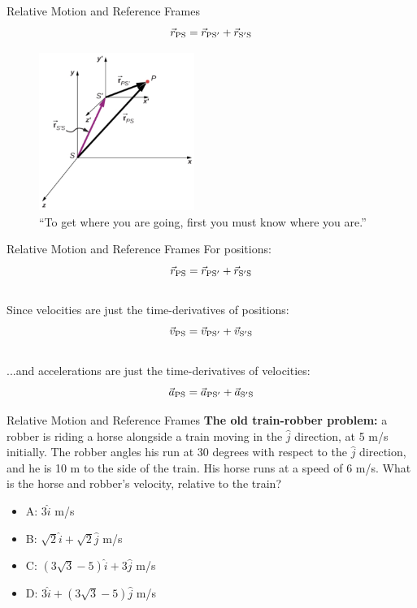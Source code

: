 \documentclass{beamer}
\begin{document}
\begin{frame}{Relative Motion and Reference Frames}
\small
\begin{equation}
\vec{r}_{\rm PS} = \vec{r}_{\rm PS'} + \vec{r}_{\rm S'S}
\end{equation}
\begin{figure}
\centering
\includegraphics[width=0.45\textwidth]{figures/frames.png}
\caption{\label{fig:frame} \small ``To get where you are going, first you must know where you are.''}
\end{figure}
\end{frame}

\begin{frame}{Relative Motion and Reference Frames}
For positions:
\begin{equation}
\vec{r}_{\rm PS} = \vec{r}_{\rm PS'} + \vec{r}_{\rm S'S}
\end{equation}\\
Since velocities are just the time-derivatives of positions:
\begin{equation}
\vec{v}_{\rm PS} = \vec{v}_{\rm PS'} + \vec{v}_{\rm S'S}
\end{equation}\\
...and accelerations are just the time-derivatives of velocities:
\begin{equation}
\vec{a}_{\rm PS} = \vec{a}_{\rm PS'} + \vec{a}_{\rm S'S}
\end{equation}
\end{frame}

\begin{frame}{Relative Motion and Reference Frames}
\small 
\textbf{The old train-robber problem:} a robber is riding a horse alongside a train moving in the $\hat{j}$ direction, at 5 m/s initially.  The robber angles his run at 30 degrees with respect to the $\hat{j}$ direction, and he is 10 m to the side of the train.  His horse runs at a speed of 6 m/s.  What is the horse and robber's velocity, relative to the train?\\
\begin{itemize}
\item A: $3\hat{i}$ m/s
\item B: $\sqrt{2}\hat{i} + \sqrt{2}\hat{j}$ m/s
\item C: $(3\sqrt{3}-5)\hat{i} + 3\hat{j}$  m/s
\item D: $3\hat{i} + (3\sqrt{3}-5)\hat{j}$  m/s
\end{itemize}
\end{frame}
\end{document}
